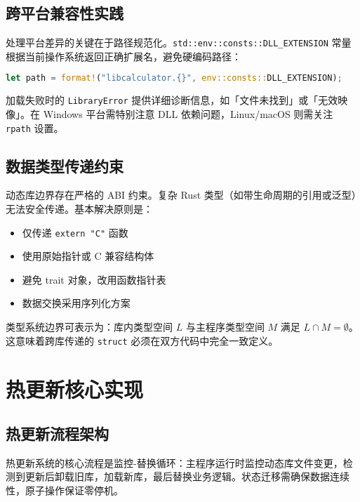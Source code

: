 \section{跨平台兼容性实践}
处理平台差异的关键在于路径规范化。\texttt{std::env::consts::DLL\_{}EXTENSION} 常量根据当前操作系统返回正确扩展名，避免硬编码路径：\par
\begin{lstlisting}[language=rust]
let path = format!("libcalculator.{}", env::consts::DLL_EXTENSION);
\end{lstlisting}
加载失败时的 \texttt{LibraryError} 提供详细诊断信息，如「文件未找到」或「无效映像」。在 Windows 平台需特别注意 DLL 依赖问题，Linux/macOS 则需关注 \texttt{rpath} 设置。\par
\section{数据类型传递约束}
动态库边界存在严格的 ABI 约束。复杂 Rust 类型（如带生命周期的引用或泛型）无法安全传递。基本解决原则是：\par
\begin{itemize}
\item 仅传递 \texttt{extern "C"} 函数
\item 使用原始指针或 C 兼容结构体
\item 避免 trait 对象，改用函数指针表
\item 数据交换采用序列化方案
\end{itemize}
类型系统边界可表示为：库内类型空间 $L$ 与主程序类型空间 $M$ 满足 $L \cap M = \emptyset$。这意味着跨库传递的 \texttt{struct} 必须在双方代码中完全一致定义。\par
\chapter{热更新核心实现}
\section{热更新流程架构}
热更新系统的核心流程是监控-替换循环：主程序运行时监控动态库文件变更，检测到更新后卸载旧库，加载新库，最后替换业务逻辑。状态迁移需确保数据连续性，原子操作保证零停机。\par
